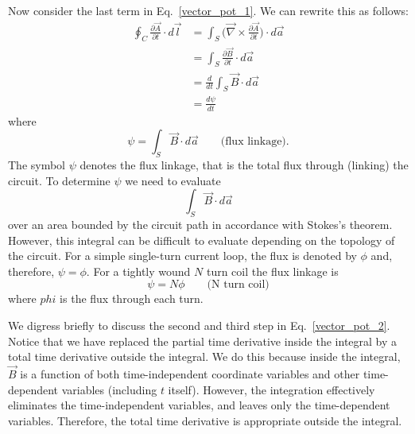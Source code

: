 \documentclass[12pt,a4paper,oneside]{book}
\begin{document}
\begin{onehalfspace}
Now consider the last term in Eq.~\eqref{vector_pot_1}. We can rewrite this as follows:
 \begin{equation}\label{vector_pot_2}
 	\begin{aligned}
 		\oint_{C} \frac{\partial \vec{A}}{\partial t}\cdot d\vec{l} &= \int_S\Big(\vec{\nabla}\times\frac{\partial \vec{A}}{\partial t}\Big)\cdot d\vec{a} \\[8pt]
 		&=\int_S\frac{\partial \vec{B}}{\partial t}\cdot d\vec{a} \\[8pt]
 		&=\frac{d}{dt}\int_S\vec{B}\cdot d\vec{a} \\[8pt]
 		&= \frac{d\psi}{dt}
 	\end{aligned}
 \end{equation} 
where $$\psi = \int_S\vec{B}\cdot d\vec{a} \qquad\text{(flux linkage).}$$
The symbol $\psi$ denotes the flux linkage, that is the total flux through (linking) the circuit. To determine $\psi$ we need to evaluate $$\int_S\vec{B}\cdot d\vec{a}$$ over an area bounded by the circuit path in accordance with Stokes's theorem. However, this integral can be difficult to evaluate depending on the topology of the circuit. For a simple single-turn current loop, the flux is denoted by $\phi$ and, therefore, $\psi=\phi$. For a tightly wound $N$ turn coil the flux linkage is $$\psi=N\phi\qquad\text{(N turn coil)}$$
where $phi$ is the flux through each turn.

We digress briefly to discuss the second and third step in Eq.~\eqref{vector_pot_2}. Notice that we have replaced the partial time derivative inside the integral by a total time derivative outside the integral. We do this because inside the integral, $\vec{B}$ is a function of both time-independent coordinate variables and other time-dependent variables (including $t$ itself). However, the integration effectively eliminates the time-independent variables, and leaves only the time-dependent variables. Therefore, the total time derivative is appropriate outside the integral. 


\end{onehalfspace}
\end{document}
